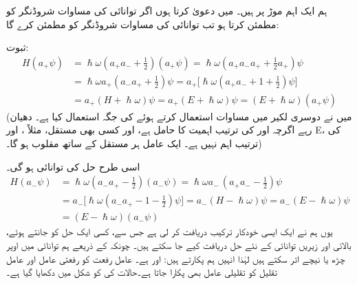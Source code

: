  ہم ایک اہم موڑ پر ہیں۔ میں دعویٰ کرتا ہوں اگر توانائی  کی مساوات شروڈنگر کو  مطمئن کرتا ہو 
  تب توانائی  کی مساوات شروڈنگر کو  مطمئن کرے گا: 

ثبوت:
\begin{align*}
H ( a_+ \psi ) &= \hslash \omega ( a_+ a_- + \frac{1}{2}) (a_+ \psi) = \hslash \omega (a_+ a_- a_+ + \frac{1}{2} a_+) \psi
\\
 &= \hslash \omega a_+ ( a_- a_+ + \tfrac{1}{2} ) \psi = a_+\big[ \hslash \omega ( a_+ a_- + 1 + \tfrac{1}{2} ) \psi \big ]\\
 &= a_+ ( H + \hslash \omega ) \psi = a_+ ( E + \hslash \omega ) \psi = ( E + \hslash \omega ) ( a_+ \psi )
\end{align*} 
(میں نے دوسری لکیر میں مساوات  استعمال کرتے ہوئے 
 کی جگہ  استعمال کیا ہے۔ دھیان رہے اگرچہ  اور  کی ترتیب اہمیت کا حامل ہے، 
 اور کسی بھی مستقل، مثلاً ،  اور E، کی ترتیب اہم نہیں ہے۔ ایک عامل ہر مستقل کے ساتھ مقلوب ہو گا۔)

 اسی طرح حل  کی توانائی  ہو گی۔
\begin{align*}
H(a_- \psi ) &= \hslash \omega ( a_- a_+ - \tfrac{1}{2}) (a_- \psi) = \hslash \omega a_- \,( a_+ a_- - \tfrac{1}{2} ) \psi\\
&= a_- \big[ \hslash \omega ( a_- a_+ - 1 - \tfrac{1}{2} ) \psi \big] = a_- ( H - \hslash \omega )\psi = a_- ( E - \hslash \omega) \psi \\	
&=( E - \hslash \omega ) ( a_- \psi )
\end{align*}
یوں ہم نے ایک ایسی خودکار ترکیب دریافت کر لی ہے جس سے، کسی ایک حل کو جانتے ہوئے، بالائی اور زیریں توانائی کے نئے حل دریافت کیے جا سکتے ہیں۔ چونکہ  کے ذریعے ہم توانائی میں اوپر چڑھ یا نیچے اتر سکتے ہیں لہٰذا انہیں ہم  پکارتے ہیں:   اور   ہے۔ عامل رفعت کو رفعتی عامل اور عامل تقلیل کو تقلیلی عامل بھی پکارا جاتا ہے۔حالات کی  کو شکل  میں دکھایا گیا ہے۔

